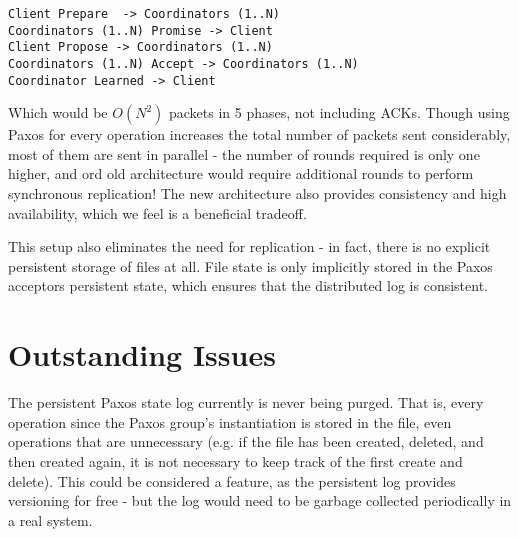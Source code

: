 \documentclass[11pt]{article}
\begin{document}
\begin{verbatim}
Client Prepare  -> Coordinators (1..N)
Coordinators (1..N) Promise -> Client
Client Propose -> Coordinators (1..N)
Coordinators (1..N) Accept -> Coordinators (1..N)
Coordinator Learned -> Client
\end{verbatim}

Which would be $O(N^2)$ packets in 5 phases, not including ACKs.
Though using Paxos for every operation increases the total number of packets sent considerably, most of them are sent in parallel -
the number of rounds required is only one higher, and ord old architecture would require additional rounds to perform synchronous replication! 
The new architecture also provides consistency and high availability, which we feel is a beneficial tradeoff.

This setup also eliminates the need for replication - in fact, there is no explicit persistent storage of files at all. 
File state is only implicitly stored in the Paxos acceptors persistent state, which ensures that the distributed log is consistent.

\section{Outstanding Issues}
The persistent Paxos state log currently is never being purged.
That is, every operation since the Paxos group's instantiation is stored in the file, even operations that are unnecessary (e.g. if the file has been created, deleted, and then created again, it is not necessary to keep track of the first create and delete).
This could be considered a feature, as the persistent log provides versioning for free - but the log would need to be garbage collected periodically in a real system.
\end{document}
